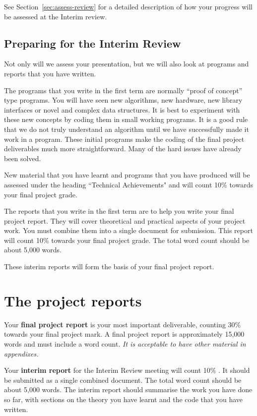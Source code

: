 \documentclass[11pt]{article}
\newcommand{\reportweight}{30\% }
\newcommand{\interimreportweight}{10\% }
\newcommand{\interimtechnicalweight}{10\% }
\newcommand{\finalreportlength}{15,000 }
\newcommand{\interimReportLength}{5,000 }
\begin{document}
See Section~\ref{sec:assess-review} for a detailed description of how your progress will be assessed at the Interim review.

\subsection{Preparing for the Interim Review}

Not only will we assess your presentation, but we will also look at programs and reports that you have written.

The programs that you write in the first term are normally ``proof of concept'' type programs.  You will have seen new algorithms, new hardware, new library interfaces or novel and complex data structures.  It is best to experiment with these new concepts by coding them in small working programs.  It is a good rule that we do not truly understand an algorithm until we have successfully made it work in a program.  These initial programs make the coding of the final project deliverables much more straightforward.  Many of the hard issues have already been solved.

New material that you have learnt and programs that you have produced will be assessed under the heading ``Technical Achievements" and will count \interimtechnicalweight towards your final project grade.

The reports that you write in the first term are to help you write your final project report.  They will cover theoretical and practical aspects of your project work.  You must combine them into a single document for submission.  This report will count \interimreportweight towards your final project grade.  The total word count should be about \interimReportLength words.

These interim reports will form the basis of your final project report.

\newpage
\section{The project reports}

Your \textbf{final project report} is your most important deliverable, counting \reportweight towards your final project mark.  A final project report is approximately \finalreportlength words and must include a word count.  \textit{It is acceptable to have other material in appendixes.}

Your \textbf{interim report} for the Interim Review meeting will count \interimreportweight.  It should be submitted as a single combined document. The total word count should be about \interimReportLength words. The interim report  should summarise the work you have done so far, with sections on the theory you have learnt and the code that you have written.
\end{document}
